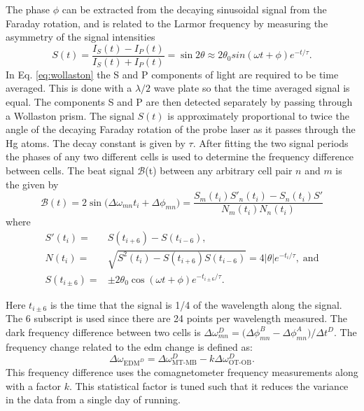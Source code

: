 The phase $\phi$ can be extracted from the decaying sinusoidal signal from the Faraday rotation, and is related to the Larmor frequency by measuring the asymmetry of the signal intensities
\begin{equation}\label{eq:wollaston}
    S(t) = \frac{I_S(t)-I_P(t)}{I_S(t)+I_P(t)} = \sin{ 2\theta }\approx 2\theta_0 sin{(\omega t + \phi)}e^{-t/\tau}.
\end{equation}%
In Eq. \ref{eq:wollaston} the S and P components of light are required to be time averaged. This is done with a $\lambda/2$ wave plate so that the time averaged signal is equal. The components S and P are then detected separately by passing through a Wollaston prism. The signal $S(t)$ is approximately proportional to twice the angle of the decaying Faraday rotation of the probe laser as it passes through the Hg atoms. The decay constant is given by $\tau$. After fitting the two signal periods the phases of any two different cells is used to determine the frequency difference between cells. The beat signal $\mathcal{B}$(t) between any arbitrary cell pair $n$ and $m$ is the given by
\begin{equation}
    \mathcal{B}(t)=2\sin{\big(\Delta \omega_{mn}t_i+\Delta \phi_{mn} \big)} = \frac{S_m(t_i)S'_n(t_i)-S_n(t_i)S'}{N_m(t_i)N_n(t_i)}
\end{equation}
where
\begin{equation}
\begin{split}
       S'(t_i)=& S(t_{i+6})-S(t_{i-6}),\\
    N(t_i) =& \sqrt{S^2(t_i)-S(t_{i+6})S(t_{i-6})} = 4|\theta|e^{-t_i/\tau}, \; \textrm{and}\\
    S(t_{i\pm 6})=&\pm 2 \theta_0 \cos(\omega t + \phi)e^{-t_{i\pm 6}/\tau}.
\end{split}
\end{equation}

Here $t_{i\pm6}$ is the time that the signal is 1/4 of the wavelength along the signal. The 6 subscript is used since there are 24 points per wavelength measured. The dark frequency difference between two cells is $\Delta \omega^D_{mn} = \big( \Delta \phi^B_{mn}-\Delta \phi^A_{mn} \big)/\Delta t^D$. The frequency change related to the \gls{edm} change is defined as:
\begin{equation}
    \Delta \omega_{\textrm{EDM}^D} = \Delta \omega_{\textrm{MT-MB}}^D-k\Delta \omega_{\textrm{OT-OB}}^D.
\end{equation}
This frequency difference uses the comagnetometer frequency measurements along with a factor $k$. This statistical factor is tuned such that it reduces the variance in the data from a single day of running. 